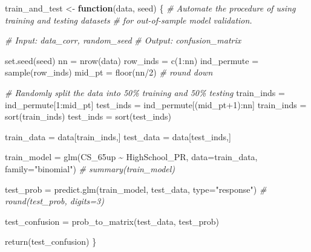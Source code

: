 \documentclass[
]{article}
\newenvironment{Shaded}{\begin{snugshade}}{\end{snugshade}}
\newcommand{\AttributeTok}[1]{\textcolor[rgb]{0.77,0.63,0.00}{#1}}
\newcommand{\CommentTok}[1]{\textcolor[rgb]{0.56,0.35,0.01}{\textit{#1}}}
\newcommand{\ControlFlowTok}[1]{\textcolor[rgb]{0.13,0.29,0.53}{\textbf{#1}}}
\newcommand{\DecValTok}[1]{\textcolor[rgb]{0.00,0.00,0.81}{#1}}
\newcommand{\FunctionTok}[1]{\textcolor[rgb]{0.00,0.00,0.00}{#1}}
\newcommand{\NormalTok}[1]{#1}
\newcommand{\OtherTok}[1]{\textcolor[rgb]{0.56,0.35,0.01}{#1}}
\newcommand{\SpecialCharTok}[1]{\textcolor[rgb]{0.00,0.00,0.00}{#1}}
\newcommand{\StringTok}[1]{\textcolor[rgb]{0.31,0.60,0.02}{#1}}
\begin{document}
\begin{Shaded}
\begin{Highlighting}[]
\NormalTok{train\_and\_test }\OtherTok{\textless{}{-}} \ControlFlowTok{function}\NormalTok{(data, seed) \{}
  \CommentTok{\# Automate the procedure of using training and testing datasets }
  \CommentTok{\# for out{-}of{-}sample model validation.}
  
  \CommentTok{\# Input: data\_corr, random\_seed}
  \CommentTok{\# Output: confusion\_matrix}
  
  \FunctionTok{set.seed}\NormalTok{(seed)}
\NormalTok{  nn }\OtherTok{=} \FunctionTok{nrow}\NormalTok{(data)}
\NormalTok{  row\_inds }\OtherTok{=} \FunctionTok{c}\NormalTok{(}\DecValTok{1}\SpecialCharTok{:}\NormalTok{nn)}
\NormalTok{  ind\_permute }\OtherTok{=} \FunctionTok{sample}\NormalTok{(row\_inds)}
\NormalTok{  mid\_pt }\OtherTok{=} \FunctionTok{floor}\NormalTok{(nn}\SpecialCharTok{/}\DecValTok{2}\NormalTok{) }\CommentTok{\# round down}
  
  \CommentTok{\# Randomly split the data into 50\% training and 50\% testing}
\NormalTok{  train\_inds }\OtherTok{=}\NormalTok{ ind\_permute[}\DecValTok{1}\SpecialCharTok{:}\NormalTok{mid\_pt]}
\NormalTok{  test\_inds }\OtherTok{=}\NormalTok{ ind\_permute[(mid\_pt}\SpecialCharTok{+}\DecValTok{1}\NormalTok{)}\SpecialCharTok{:}\NormalTok{nn]}
\NormalTok{  train\_inds }\OtherTok{=} \FunctionTok{sort}\NormalTok{(train\_inds)}
\NormalTok{  test\_inds }\OtherTok{=} \FunctionTok{sort}\NormalTok{(test\_inds)}

\NormalTok{  train\_data }\OtherTok{=}\NormalTok{ data[train\_inds,]}
\NormalTok{  test\_data }\OtherTok{=}\NormalTok{ data[test\_inds,]}

\NormalTok{  train\_model }\OtherTok{=} \FunctionTok{glm}\NormalTok{(CS\_65up }\SpecialCharTok{\textasciitilde{}}\NormalTok{ HighSchool\_PR, }\AttributeTok{data=}\NormalTok{train\_data, }\AttributeTok{family=}\StringTok{"binomial"}\NormalTok{)}
  \CommentTok{\# summary(train\_model)}

\NormalTok{  test\_prob }\OtherTok{=} \FunctionTok{predict.glm}\NormalTok{(train\_model, test\_data, }\AttributeTok{type=}\StringTok{"response"}\NormalTok{)}
  \CommentTok{\# round(test\_prob, digits=3)}
  
\NormalTok{  test\_confusion }\OtherTok{=} \FunctionTok{prob\_to\_matrix}\NormalTok{(test\_data, test\_prob)}

  \FunctionTok{return}\NormalTok{(test\_confusion)}
\NormalTok{\}}
\end{Highlighting}
\end{Shaded}
\end{document}
